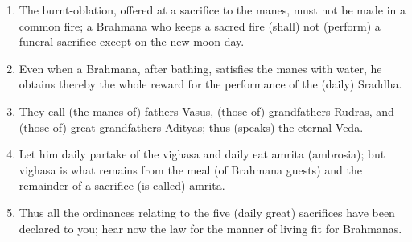 \begin{enumerate}
\item The burnt-oblation, offered at a sacrifice to the manes, must not be made in a common fire; a Brahmana who keeps a sacred fire (shall) not (perform) a funeral sacrifice except on the new-moon day.
\item Even when a Brahmana, after bathing, satisfies the manes with water, he obtains thereby the whole reward for the performance of the (daily) Sraddha.
\item They call (the manes of) fathers Vasus, (those of) grandfathers Rudras, and (those of) great-grandfathers Adityas; thus (speaks) the eternal Veda.
\item Let him daily partake of the vighasa and daily eat amrita (ambrosia); but vighasa is what remains from the meal (of Brahmana guests) and the remainder of a sacrifice (is called) amrita.
\item Thus all the ordinances relating to the five (daily great) sacrifices have been declared to you; hear now the law for the manner of living fit for Brahmanas.
\end{enumerate}

